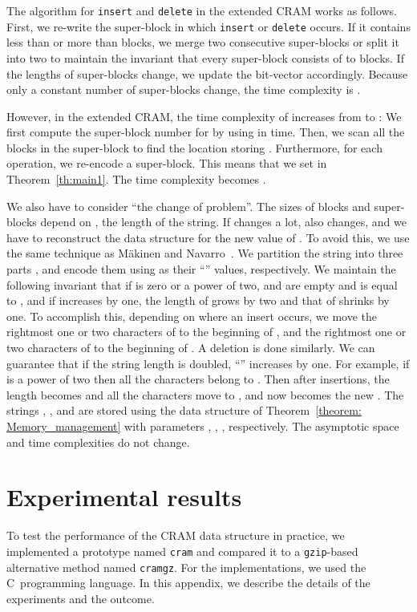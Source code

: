 \documentclass{llncs}
\begin{document}
The algorithm for \texttt{insert} and \texttt{delete} in
the extended CRAM works as follows.
First, we re-write the super-block in which \texttt{insert} or \texttt{delete} occurs.
If it contains less than  or more than  blocks, we merge two consecutive super-blocks
or split it into two to maintain the invariant that every super-block consists of  to  blocks.  If the lengths of super-blocks change, we update the bit-vector  accordingly.
Because only a constant number of super-blocks change, the time complexity is 
.

However, in the extended CRAM, the time complexity of 
increases from  to :
We first compute the super-block number for  by using
 in  time.
Then, we scan all the blocks in the super-block
to find the location storing .
Furthermore, for each  operation, we re-encode
a super-block.
This means that we set  in Theorem~\ref{th:main1}.
The time complexity becomes .

We also have to consider ``the change of  problem''.
The sizes of blocks and super-blocks
depend on , the length of the string.  If  changes a lot,  also changes, and
we have to reconstruct the data structure for the new value of .  To avoid this,
we use the same technique as M{\"a}kinen and Navarro~\cite{MNtalg08}.  We partition the string  into three parts
, and encode them using  as their ``'' values,
respectively.  
We maintain the following invariant that
if  is zero or a power of two,  and  are empty and  is
equal to , and
if  increases by one, the length of  grows by two and that of 
shrinks by one.  To accomplish this,
depending on where an insert occurs, we move the rightmost one or two characters
of  to the beginning of , and the rightmost one or two characters of  to the beginning of .
A deletion is done similarly.
We can guarantee that if the string length is doubled,
``'' increases by one.
For example, if  is a power of two then all the characters belong to .
Then after  insertions, the length becomes  and
all the characters move to , and now  becomes the new .
The strings , , and  are stored using
the data structure of Theorem~\ref{theorem: Memory_management} with parameters
,
,
,
respectively.
The asymptotic space and time complexities do not change.




\section{Experimental results}
\label{sec:experiments}

To test the performance of the CRAM data structure in practice, we
implemented a prototype named \texttt{cram} and compared it to
a \texttt{gzip}-based alternative method named \texttt{cramgz}.
For the implementations, we used the C~programming language.
In this appendix, we describe the details of the experiments and the outcome.
\end{document}
